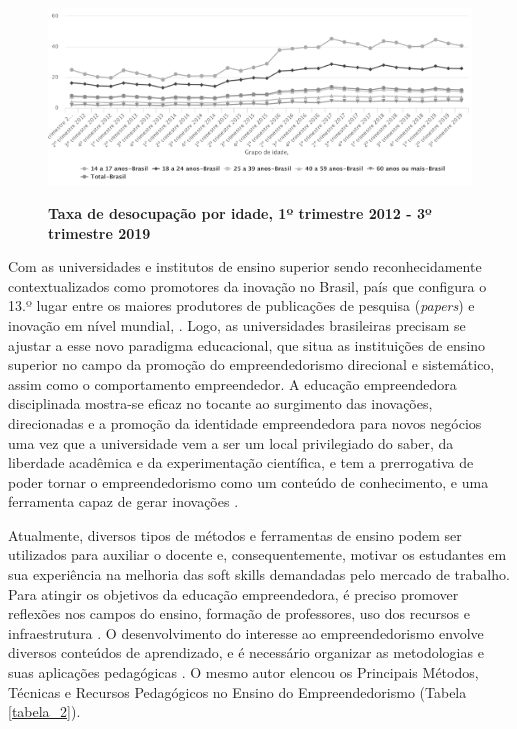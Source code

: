 \begin{figure}[!htb]
\centering
\caption{\textbf{Taxa de desocupação por idade, 1º trimestre 2012 - 3º trimestre 2019}}
\includegraphics[scale=0.25]{Imagens/taxa_desocupacao.png}
\label{figura_2}
\end{figure}
\newpage

Com as universidades e institutos de ensino superior sendo reconhecidamente contextualizados como promotores da inovação no Brasil, país que configura o 13.º lugar entre os maiores produtores de publicações de pesquisa (\textit{papers}) e inovação em nível mundial, . 
Logo, as universidades brasileiras precisam se ajustar a esse novo paradigma educacional, que situa as instituições de ensino superior no campo da promoção do empreendedorismo direcional e sistemático, assim como o comportamento empreendedor. A educação empreendedora disciplinada mostra-se eficaz no tocante ao surgimento das inovações, direcionadas e a promoção da identidade empreendedora para novos negócios \cite{jain_academics_2009} uma vez que a universidade vem a ser um local privilegiado do saber, da liberdade acadêmica e da experimentação científica, e tem a prerrogativa de poder tornar o empreendedorismo como um conteúdo de conhecimento, e uma ferramenta capaz de gerar inovações \cite{dolabela_oficina_2008}. 


Atualmente, diversos tipos de métodos e ferramentas de ensino podem ser utilizados para auxiliar o docente e, consequentemente, motivar os estudantes em sua experiência na melhoria das soft skills demandadas pelo mercado de trabalho. Para atingir os objetivos da educação empreendedora, é preciso promover reflexões nos campos do ensino, formação de professores, uso dos recursos e infraestrutura \cite{marques_experiencia_2019}. O desenvolvimento do interesse ao empreendedorismo envolve diversos conteúdos de aprendizado, e é necessário organizar as metodologias e suas aplicações pedagógicas \cite{rocha_avaliacao_2014}. O mesmo autor elencou os Principais Métodos, Técnicas e Recursos Pedagógicos no Ensino do Empreendedorismo (Tabela \ref{tabela_2}). 




